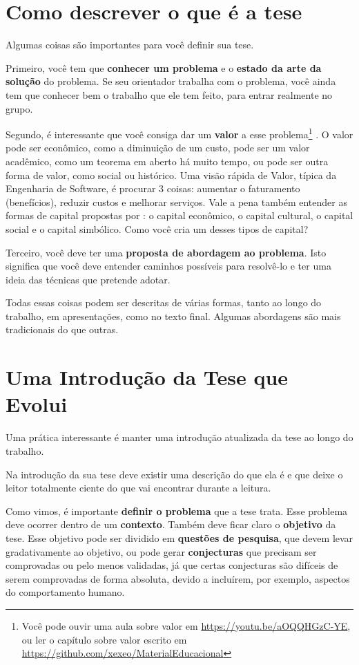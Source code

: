 \section{Como descrever o que é a tese}

Algumas coisas são importantes para você definir sua tese.

Primeiro, você tem que \textbf{conhecer um problema} e o \textbf{estado da arte da solução} do problema. Se seu orientador trabalha com o problema, você ainda tem que conhecer bem o trabalho que ele tem feito, para entrar realmente no grupo.

Segundo, é interessante que você consiga dar um \textbf{valor} a esse problema\footnote{Você pode ouvir uma aula sobre valor em \url{https://youtu.be/aOQQHGzC-YE}, ou ler o capítulo sobre valor escrito em \url{https://github.com/xexeo/MaterialEducacional}} . O valor pode ser econômico, como a diminuição de um custo, pode ser um valor acadêmico, como um teorema em aberto há muito tempo, ou pode ser outra forma de valor, como social ou histórico. Uma visão rápida de Valor, típica da Engenharia de Software, é procurar 3 coisas: aumentar o faturamento (benefícios), reduzir custos e melhorar serviços. Vale a pena também entender as formas de capital propostas por \citet{bourdieu1986forms}: o capital econômico, o capital cultural, o capital social e o capital simbólico. Como você cria um desses tipos de capital?

Terceiro, você deve ter uma \textbf{proposta de abordagem ao problema}. Isto significa que você deve entender caminhos possíveis para resolvê-lo e ter uma ideia das técnicas que pretende adotar.

Todas essas coisas podem ser descritas de várias formas, tanto ao longo do trabalho, em apresentações, como no texto final. Algumas abordagens são mais tradicionais do que outras.

\section{Uma Introdução da Tese que Evolui}

Uma prática interessante é manter uma introdução atualizada da tese ao longo do trabalho. 

Na introdução da sua tese deve existir uma descrição do que ela é e que deixe o leitor totalmente ciente do que vai encontrar durante a leitura. 

Como vimos, é importante \textbf{definir o problema} que a tese trata. Esse problema deve ocorrer dentro de um \textbf{contexto}. Também deve ficar claro o \textbf{objetivo} da tese. Esse objetivo pode ser dividido em \textbf{questões de pesquisa}, que devem levar gradativamente ao objetivo, ou pode gerar \textbf{conjecturas} que precisam ser comprovadas ou pelo menos validadas, já que certas conjecturas são difíceis de serem comprovadas de forma absoluta, devido a incluírem, por exemplo, aspectos do comportamento humano.

